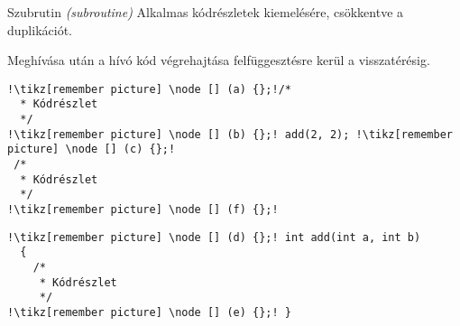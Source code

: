 \begin{frame}[fragile]{Szubrutin \textit{(subroutine)}}
Alkalmas kódrészletek kiemelésére, csökkentve a duplikációt.

Meghívása után a hívó kód végrehajtása felfüggesztésre kerül a visszatérésig.
\\
\begin{center}
\begin{minipage}{.40\textwidth}
\begin{lstlisting}[title=Hívó, frame=t, escapechar=!]
!\tikz[remember picture] \node [] (a) {};!/*
  * Kódrészlet
  */
!\tikz[remember picture] \node [] (b) {};! add(2, 2); !\tikz[remember picture] \node [] (c) {};!
 /*
  * Kódrészlet
  */
!\tikz[remember picture] \node [] (f) {};!
\end{lstlisting}
\end{minipage}\hfill
\begin{minipage}{.50\textwidth}
\begin{lstlisting}[title=Szubrutin, frame=t, escapechar=!, showlines=true]
!\tikz[remember picture] \node [] (d) {};! int add(int a, int b)
  {
    /*
     * Kódrészlet
     */
!\tikz[remember picture] \node [] (e) {};! }


\end{lstlisting}
\end{minipage}
\end{center}
\par
\end{frame}


